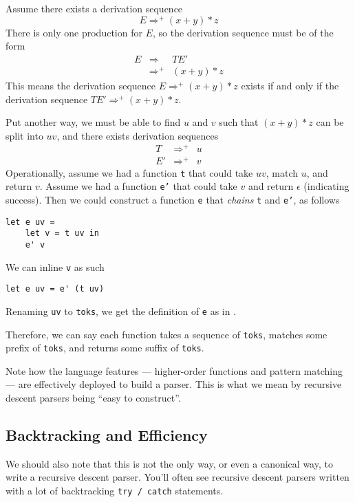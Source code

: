 Assume there exists a derivation sequence
\[E \Rightarrow^{+} (x+y) * z\]
There is only one production for $E$, so the derivation sequence must be of the form
\[
\begin{array}{rll}
E&\Rightarrow&TE'\\
&{\Rightarrow^{+}}&(x+y) * z
\end{array}
\]
This means the derivation sequence $E \Rightarrow^{+} (x+y) * z$ exists if and only if the derivation sequence $TE' \Rightarrow^{+} (x+y) * z$.

Put another way, we must be able to find $u$ and $v$ such that $(x + y) * z$ can be split into $uv$, and there exists derivation sequences
\[
\begin{array}{rcl}
T&{\Rightarrow^{+}}&u\\
{E'}&{\Rightarrow^{+}}&v
\end{array}
\]
Operationally, assume we had a function \texttt{t} that could take $uv$, match $u$, and return $v$. Assume we had a function \texttt{e'} that could take $v$ and return $\epsilon$ (indicating success). Then we could construct a function \texttt{e} that \textit{chains} \texttt{t} and \texttt{e'}, as follows
\begin{verbatim}
let e uv =
    let v = t uv in
    e' v
\end{verbatim}
We can inline \texttt{v} as such
\begin{verbatim}
let e uv = e' (t uv)
\end{verbatim}
Renaming \texttt{uv} to \texttt{toks}, we get the definition of \texttt{e} as in .

Therefore, we can say each function takes a sequence of \texttt{toks}, matches some prefix of \texttt{toks}, and returns some suffix of \texttt{toks}.

Note how the language features --- higher-order functions and pattern matching --- are effectively deployed to build a parser. This is what we mean by recursive descent parsers being ``easy to construct''.

\subsection{Backtracking and Efficiency}
We should also note that this is not the only way, or even a canonical way, to write a recursive descent parser. You'll often see recursive descent parsers written with a lot of backtracking \texttt{try / catch} statements.

